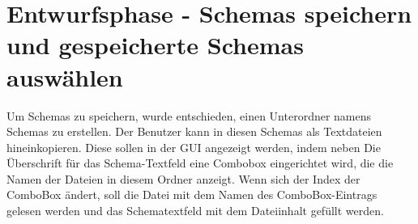\section{Entwurfsphase - Schemas speichern und gespeicherte Schemas auswählen} 
\label{sec:Entwurfsphase1}
Um Schemas zu speichern, wurde entschieden, einen Unterordner namens Schemas zu erstellen. Der Benutzer kann in diesen Schemas als Textdateien hineinkopieren.
Diese sollen in der GUI angezeigt werden, indem neben Die Überschrift für das Schema-Textfeld eine Combobox eingerichtet wird, die die Namen der Dateien in diesem Ordner anzeigt. Wenn sich der Index der ComboBox ändert, soll die Datei mit dem Namen des ComboBox-Eintrags gelesen werden und das Schematextfeld mit dem Dateiinhalt gefüllt werden.
